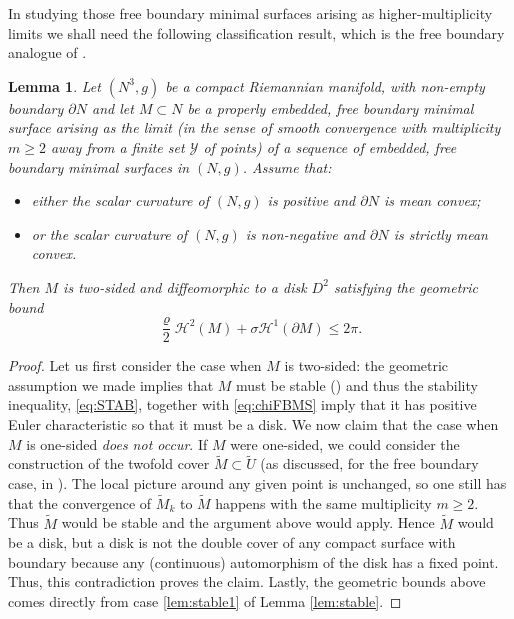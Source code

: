 \documentclass[10pt]{amsart}
\let\mathcal\mathscr
\newcounter{cas}
\newtheorem{lem}[thm]{Lemma}
\theoremstyle{definition}
\newcommand{\h}{\mathscr{H}}
\begin{document}
In studying those free boundary minimal surfaces arising as higher-multiplicity limits we shall need the following classification result, which is the free boundary analogue of \cite[Lem.\,14]{ABCS18}.

\begin{lem}\label{lem:stable-type}
Let $(N^3,g)$ be a compact Riemannian manifold, with non-empty boundary $\partial N$ and let $M\subset N$ be a properly embedded, free boundary minimal surface arising as the limit (in the sense of smooth convergence with multiplicity $m\geq 2$ away from a finite set $\mathcal{Y}$ of points) of a sequence of embedded, free boundary minimal surfaces in $(N,g)$.
Assume that:
\begin{itemize}
\item
\emph{either} the scalar curvature of $(N,g)$ is positive and $\partial N$ is mean convex;
\item
\emph{or} the scalar curvature of $(N,g)$ is non-negative and $\partial N$ is strictly mean convex.
\end{itemize}
Then $M$ is two-sided and diffeomorphic to a disk $D^2$ satisfying the geometric bound
\[
\frac{\varrho}{2}\h^2(M)+\sigma\h^1(\partial M)\leq 2\pi.
\]
\end{lem}

\begin{proof}
Let us first consider the case when $M$ is two-sided: the geometric assumption we made implies that $M$ must be stable (\cf \cite[\S5]{ACS17}) and thus the stability inequality, \cf \eqref{eq:STAB}, together with \eqref{eq:chiFBMS}
imply that it has positive Euler characteristic so that it must be a disk.
We now claim that the case when $M$ is one-sided \emph{does not occur}. If $M$ were one-sided, we could consider the construction of the twofold cover $\widetilde{M}\subset\widetilde{U}$ (as discussed, for the free boundary case, in \cite[\S6]{ACS17}).
The local picture around any given point is unchanged, so one still has that the convergence of $\widetilde{M}_k$ to $\widetilde{M}$ happens with the same multiplicity $m\geq 2$. Thus $\widetilde{M}$ would be stable and the argument above would apply. Hence $\widetilde{M}$ would be a disk, but a disk is not the double cover of any compact surface with boundary because any (continuous) automorphism of the disk has a fixed point. Thus, this contradiction proves the claim.
Lastly, the geometric bounds above comes directly from case \eqref{lem:stable1} of Lemma \ref{lem:stable}.
\end{proof}
\end{document}
